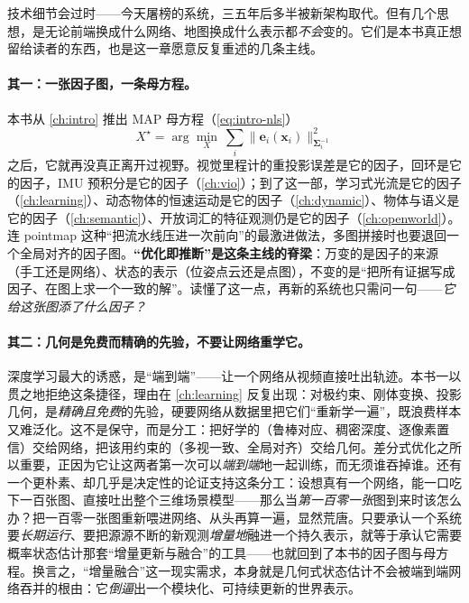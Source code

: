 技术细节会过时——今天屠榜的系统，三五年后多半被新架构取代。但有几个思想，是无论前端换成什么网络、地图换成什么表示都\emph{不会}变的。它们是本书真正想留给读者的东西，也是这一章愿意反复重述的几条主线。

\paragraph{其一：一张因子图，一条母方程。}
本书从 \cref{ch:intro} 推出 MAP 母方程（\cref{eq:intro-nls}）
\begin{equation*}
  X^\star=\arg\min_X\ \sum_i \big\|\mathbf{e}_i(\mathbf{x}_i)\big\|_{\boldsymbol\Sigma_i^{-1}}^2
\end{equation*}
之后，它就再没真正离开过视野。视觉里程计的重投影误差是它的因子，回环是它的因子，IMU 预积分是它的因子（\cref{ch:vio}）；到了这一部，学习式光流是它的因子（\cref{ch:learning}）、动态物体的恒速运动是它的因子（\cref{ch:dynamic}）、物体与语义是它的因子（\cref{ch:semantic}）、开放词汇的特征观测仍是它的因子（\cref{ch:openworld}）。连 pointmap 这种“把流水线压进一次前向”的最激进做法，多图拼接时也要退回一个全局对齐的因子图。\textbf{“优化即推断”是这条主线的脊梁}：万变的是因子的来源（手工还是网络）、状态的表示（位姿点云还是点图），不变的是“把所有证据写成因子、在图上求一个一致的解”。读懂了这一点，再新的系统也只需问一句——\emph{它给这张图添了什么因子？}

\paragraph{其二：几何是免费而精确的先验，不要让网络重学它。}
深度学习最大的诱惑，是“端到端”——让一个网络从视频直接吐出轨迹。本书一以贯之地拒绝这条捷径，理由在 \cref{ch:learning} 反复出现：对极约束、刚体变换、投影几何，是\emph{精确且免费}的先验，硬要网络从数据里把它们“重新学一遍”，既浪费样本又难泛化。这不是保守，而是分工：把好学的（鲁棒对应、稠密深度、逐像素置信）交给网络，把该用约束的（多视一致、全局对齐）交给几何。差分式优化之所以重要，正因为它让这两者第一次可以\emph{端到端}地一起训练，而无须谁吞掉谁。还有一个更朴素、却几乎是决定性的论证支持这条分工\cite{davison2026computational}：设想真有一个网络，能一口吃下一百张图、直接吐出整个三维场景模型——那么当\emph{第一百零一张}图到来时该怎么办？把一百零一张图重新喂进网络、从头再算一遍，显然荒唐。只要承认一个系统要\emph{长期运行}、要把源源不断的新观测\emph{增量地}融进一个持久表示，就等于承认它需要概率状态估计那套“增量更新与融合”的工具——也就回到了本书的因子图与母方程。换言之，“增量融合”这一现实需求，本身就是几何式状态估计不会被端到端网络吞并的根由：它\emph{倒逼}出一个模块化、可持续更新的世界表示。

